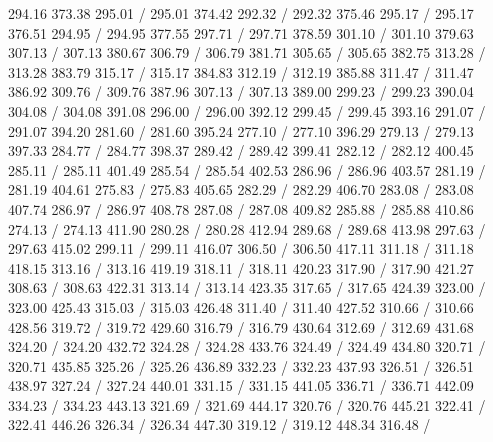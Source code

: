 { 294.16 373.38 295.01 /
 295.01 374.42 292.32 /
 292.32 375.46 295.17 /
 295.17 376.51 294.95 /
 294.95 377.55 297.71 /
 297.71 378.59 301.10 /
 301.10 379.63 307.13 /
 307.13 380.67 306.79 /
 306.79 381.71 305.65 /
 305.65 382.75 313.28 /
 313.28 383.79 315.17 /
 315.17 384.83 312.19 /
 312.19 385.88 311.47 /
 311.47 386.92 309.76 /
 309.76 387.96 307.13 /
 307.13 389.00 299.23 /
 299.23 390.04 304.08 /
 304.08 391.08 296.00 /
 296.00 392.12 299.45 /
 299.45 393.16 291.07 /
 291.07 394.20 281.60 /
 281.60 395.24 277.10 /
 277.10 396.29 279.13 /
 279.13 397.33 284.77 /
 284.77 398.37 289.42 /
 289.42 399.41 282.12 /
 282.12 400.45 285.11 /
 285.11 401.49 285.54 /
 285.54 402.53 286.96 /
 286.96 403.57 281.19 /
 281.19 404.61 275.83 /
 275.83 405.65 282.29 /
 282.29 406.70 283.08 /
 283.08 407.74 286.97 /
 286.97 408.78 287.08 /
 287.08 409.82 285.88 /
 285.88 410.86 274.13 /
 274.13 411.90 280.28 /
 280.28 412.94 289.68 /
 289.68 413.98 297.63 /
 297.63 415.02 299.11 /
 299.11 416.07 306.50 /
 306.50 417.11 311.18 /
 311.18 418.15 313.16 /
 313.16 419.19 318.11 /
 318.11 420.23 317.90 /
 317.90 421.27 308.63 /
 308.63 422.31 313.14 /
 313.14 423.35 317.65 /
 317.65 424.39 323.00 /
 323.00 425.43 315.03 /
 315.03 426.48 311.40 /
 311.40 427.52 310.66 /
 310.66 428.56 319.72 /
 319.72 429.60 316.79 /
 316.79 430.64 312.69 /
 312.69 431.68 324.20 /
 324.20 432.72 324.28 /
 324.28 433.76 324.49 /
 324.49 434.80 320.71 /
 320.71 435.85 325.26 /
 325.26 436.89 332.23 /
 332.23 437.93 326.51 /
 326.51 438.97 327.24 /
 327.24 440.01 331.15 /
 331.15 441.05 336.71 /
 336.71 442.09 334.23 /
 334.23 443.13 321.69 /
 321.69 444.17 320.76 /
 320.76 445.21 322.41 /
 322.41 446.26 326.34 /
 326.34 447.30 319.12 /
 319.12 448.34 316.48 /
}
